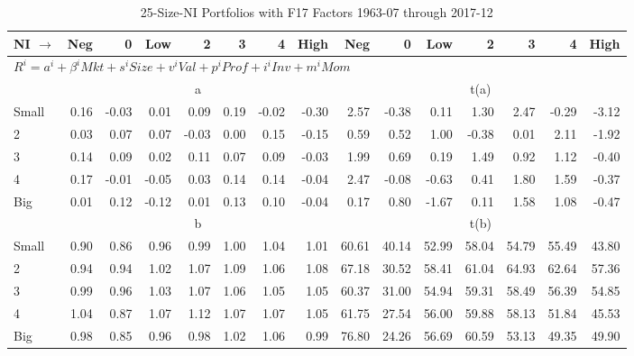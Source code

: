 
\begin{table}[!ht]
\scriptsize
\centering
\caption{25-Size-NI Portfolios with F17 Factors 1963-07 through 2017-12}
\begin{tabular}{lrrrrrrrrrrrrrr}
  \toprule
    
    NI $\rightarrow$ & Neg & 0 & Low & 2 & 3 & 4 & High & Neg & 0 & Low & 2 & 3 & 4 & High  \\ 
  \midrule
  \multicolumn{15}{l}{$R^i=a^i+\beta^iMkt+s^iSize+v^iVal+p^iProf+i^iInv+m^iMom$}  \\
  
     & \multicolumn{7}{c}{a} & \multicolumn{7}{c}{t(a)}   \\
     \cmidrule(r){2-8} \cmidrule(r){9-15} 
    Small  & 0.16  & -0.03  & 0.01  & 0.09  & 0.19  & -0.02  & -0.30  & 2.57  & -0.38  & 0.11  & 1.30  & 2.47  & -0.29  & -3.12   \\
    2  & 0.03  & 0.07  & 0.07  & -0.03  & 0.00  & 0.15  & -0.15  & 0.59  & 0.52  & 1.00  & -0.38  & 0.01  & 2.11  & -1.92   \\
    3  & 0.14  & 0.09  & 0.02  & 0.11  & 0.07  & 0.09  & -0.03  & 1.99  & 0.69  & 0.19  & 1.49  & 0.92  & 1.12  & -0.40   \\
    4  & 0.17  & -0.01  & -0.05  & 0.03  & 0.14  & 0.14  & -0.04  & 2.47  & -0.08  & -0.63  & 0.41  & 1.80  & 1.59  & -0.37   \\
    Big  & 0.01  & 0.12  & -0.12  & 0.01  & 0.13  & 0.10  & -0.04  & 0.17  & 0.80  & -1.67  & 0.11  & 1.58  & 1.08  & -0.47   \\
    
  
     & \multicolumn{7}{c}{b} & \multicolumn{7}{c}{t(b)}   \\
     \cmidrule(r){2-8} \cmidrule(r){9-15} 
    Small  & 0.90  & 0.86  & 0.96  & 0.99  & 1.00  & 1.04  & 1.01  & 60.61  & 40.14  & 52.99  & 58.04  & 54.79  & 55.49  & 43.80   \\
    2  & 0.94  & 0.94  & 1.02  & 1.07  & 1.09  & 1.06  & 1.08  & 67.18  & 30.52  & 58.41  & 61.04  & 64.93  & 62.64  & 57.36   \\
    3  & 0.99  & 0.96  & 1.03  & 1.07  & 1.06  & 1.05  & 1.05  & 60.37  & 31.00  & 54.94  & 59.31  & 58.49  & 56.39  & 54.85   \\
    4  & 1.04  & 0.87  & 1.07  & 1.12  & 1.07  & 1.07  & 1.05  & 61.75  & 27.54  & 56.00  & 59.88  & 58.13  & 51.84  & 45.53   \\
    Big  & 0.98  & 0.85  & 0.96  & 0.98  & 1.02  & 1.06  & 0.99  & 76.80  & 24.26  & 56.69  & 60.59  & 53.13  & 49.35  & 49.90   \\
    

\end{tabular}
\end{table}
